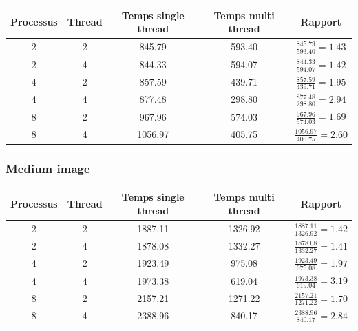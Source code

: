 \documentclass{article}
\begin{document}
\begin{tabular}{ | c | c | c | c | c | }
  \hline
  Processus & Thread & Temps single thread & Temps multi thread & Rapport \\
  \hline
  2 & 2 & 845.79 & 593.40 & $ \frac{845.79}{593.40} = 1.43 $ \\
  2 & 4 & 844.33 & 594.07 & $ \frac{844.33}{594.07} = 1.42 $ \\
  4 & 2 & 857.59 & 439.71 & $ \frac{857.59}{439.71} = 1.95 $ \\
  4 & 4 & 877.48 & 298.80 & $ \frac{877.48}{298.80} = 2.94 $ \\
  8 & 2 & 967.96 & 574.03 & $ \frac{967.96}{574.03} = 1.69 $ \\
  8 & 4 & 1056.97 & 405.75 & $ \frac{1056.97}{405.75} = 2.60 $ \\
  \hline
\end{tabular}

\subsubsection{Medium image}

\begin{tabular}{ | c | c | c | c | c | }
  \hline
  Processus & Thread & Temps single thread & Temps multi thread & Rapport \\
  \hline
  2 & 2 & 1887.11 & 1326.92 & $ \frac{1887.11}{1326.92} = 1.42 $ \\
  2 & 4 & 1878.08 & 1332.27 & $ \frac{1878.08}{1332.27} = 1.41 $ \\
  4 & 2 & 1923.49 & 975.08 & $ \frac{1923.49}{975.08} = 1.97 $ \\
  4 & 4 & 1973.38 & 619.04 & $ \frac{1973.38}{619.04} = 3.19 $ \\
  8 & 2 & 2157.21 & 1271.22 & $ \frac{2157.21}{1271.22} = 1.70 $ \\
  8 & 4 & 2388.96 & 840.17 & $ \frac{2388.96}{840.17} = 2.84 $ \\
  \hline
\end{tabular}
\end{document}
